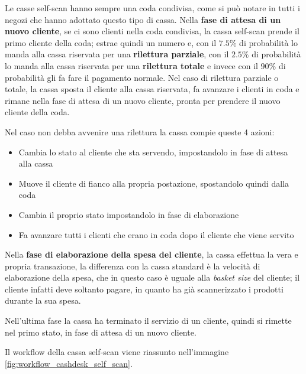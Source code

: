 Le casse self-scan hanno sempre una coda condivisa, come si può notare in tutti i negozi che hanno adottato questo tipo di cassa. Nella \textbf{fase di attesa di un nuovo cliente}, se ci sono clienti nella coda condivisa, la cassa self-scan prende il primo cliente della coda; estrae quindi un numero e, con il $7.5 \%$ di probabilità lo manda alla cassa riservata per una \textbf{rilettura parziale}, con il $2.5 \%$ di probabilità lo manda alla cassa riservata per una \textbf{rilettura totale} e invece con il $90 \%$ di probabilità gli fa fare il pagamento normale. Nel caso di rilettura parziale o totale, la cassa sposta il cliente alla cassa riservata, fa avanzare i clienti in coda e rimane nella fase di attesa di un nuovo cliente, pronta per prendere il nuovo cliente della coda.

Nel caso non debba avvenire una rilettura la cassa compie queste 4 azioni:

\begin{itemize}
\item Cambia lo stato al cliente che sta servendo, impostandolo in fase di attesa alla cassa
\item Muove il cliente di fianco alla propria postazione, spostandolo quindi dalla coda
\item Cambia il proprio stato impostandolo in fase di elaborazione
\item Fa avanzare tutti i clienti che erano in coda dopo il cliente che viene servito
\end{itemize}

Nella \textbf{fase di elaborazione della spesa del cliente}, la cassa effettua la vera e propria transazione, la differenza con la cassa standard è la velocità di elaborazione della spesa, che in questo caso è uguale alla \textit{basket size} del cliente; il cliente infatti deve soltanto pagare, in quanto ha già scannerizzato i prodotti durante la sua spesa.

Nell'ultima fase la cassa ha terminato il servizio di un cliente, quindi si rimette nel primo stato, in fase di attesa di un nuovo cliente.

Il workflow della cassa self-scan viene riassunto nell'immagine \ref{fig:workflow_cashdesk_self_scan}.

